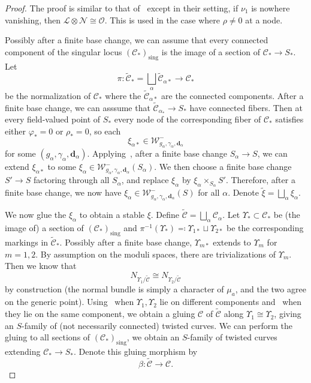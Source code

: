 \documentclass{amsart}
\theoremstyle{definition}
\theoremstyle{remark}
\theoremstyle{plain}
\theoremstyle{definition}
\theoremstyle{remark}
\newcommand{\mc}[1]{\mathcal{#1}}
\newcommand{\mbf}[1]{\mathbf{#1}}
\newcommand{\mr}[1]{\mathrm{#1}}
\newcommand{\wt}[1]{\widetilde{#1}}
\newcommand{\1}{\mathbf{1}}
\newcommand{\2}{\mathbf{2}}
\newcommand{\3}{\mathbf{3}}
\begin{document}
\begin{proof}
    The proof is similar to that of~\cite[Proposition 3.23]{mspfermat} except in their setting, if $\nu_1$ is nowhere vanishing, then $\mc{L} \otimes \mc{N} \cong \mc{O}$. This is used in the case where $\rho \neq 0$ at a node.

    Possibly after a finite base change, we can assume that every connected component of the singular locus $(\mc{C}_*)_{\mr{sing}}$ is the image of a section of $\mc{C}_* \to S_*$. Let
    \[ \pi \colon \wt{\mc{C}}_* = \bigsqcup_\alpha \wt{\mc{C}}_{\alpha*} \to \mc{C}_* \]
    be the normalization of $\mc{C}_*$ where the $\wt{ \mc{C} }_{\alpha*}$ are the connected components. After a finite base change, we can asssume that $\wt{ \mc{C} }_{\alpha_*} \to S_*$ have connected fibers. Then at every field-valued point of $S_*$ every node of the corresponding fiber of $\mc{C}_*$ satisfies either $\varphi_* = 0$ or $\rho_* = 0$, so each
    \[ \xi_{\alpha*} \in \mc{W}^-_{g_{\alpha},\gamma_{\alpha},\mbf{d}_{\alpha}} \]
    for some $(g_{\alpha},\gamma_{\alpha},\mbf{d}_{\alpha})$. Applying~, after a finite base change $S_{\alpha} \to S$, we can extend $\xi_{\alpha*}$ to some $\xi_{\alpha} \in \mc{W}^-_{g_{\alpha},\gamma_{\alpha},\mbf{d}_{\alpha}}(S_{\alpha})$. We then choose a finite base change $S' \to S$ factoring through all $S_{\alpha}$, and replace $\xi_{\alpha}$ by $\xi_{\alpha} \times_{S_{\alpha}} S'$. Therefore, after a finite base change, we now have $\xi_{\alpha} \in \mc{W}^-_{g_{\alpha},\gamma_{\alpha},\mbf{d}_{\alpha}}(S)$ for all $\alpha$. Denote $\wt{\xi} = \bigsqcup_{\alpha} \xi_{\alpha}$.

    We now glue the $\xi_{\alpha}$ to obtain a stable $\xi$. Define $\wt{\mc{C}} = \bigsqcup_{\alpha} \mc{C}_{\alpha}$. Let $\Upsilon_* \subset \mc{C}_*$ be (the image of) a section of $(\mc{C}_*)_{\mr{sing}}$ and $\pi^{-1}(\Upsilon_*) \eqqcolon \Upsilon_{1*} \sqcup \Upsilon_{2*}$ be the corresponding markings in $\wt{\mc{C}}_*$. Possibly after a finite base change, $\Upsilon_{m*}$ extends to $\Upsilon_m$ for $m=1,2$. By assumption on the moduli spaces, there are trivializations of $\Upsilon_m$. Then we know that 
    \[ N_{\Upsilon_{1}/\wt{\mc{C}}} \cong N_{\Upsilon_2/\wt{\mc{C}}} \] 
    by construction (the normal bundle is simply a character of $\mu_a$, and the two agree on the generic point). Using~\cite[Definition 1.7]{orbdegeneration} when $\Upsilon_1,\Upsilon_2$ lie on different components and~\cite[Proposition A.1.1]{gwdmstack} when they lie on the same component, we obtain a gluing $\mc{C}$ of $\wt{\mc{C}}$ along $\Upsilon_1 \cong \Upsilon_2$, giving an $S$-family of (not necessarily connected) twisted curves. We can perform the gluing to all sections of $(\mc{C}_*)_{\mr{sing}}$, we obtain an $S$-family of twisted curves extending $\mc{C}_* \to S_*$. Denote this gluing morphism by
    \[ \beta \colon \wt{\mc{C}} \to \mc{C}. \]


\end{proof}
\end{document}
